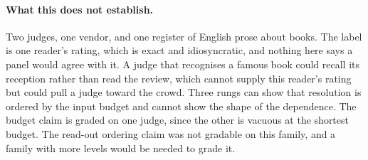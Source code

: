 \paragraph{What this does not establish.}
Two judges, one vendor, and one register of English prose about books. The label is one reader's rating, which is exact and idiosyncratic, and nothing here says a panel would agree with it. A judge that recognises a famous book could recall its reception rather than read the review, which cannot supply this reader's rating but could pull a judge toward the crowd. Three rungs can show that resolution is ordered by the input budget and cannot show the shape of the dependence. The budget claim is graded on one judge, since the other is vacuous at the shortest budget. The read-out ordering claim was not gradable on this family, and a family with more levels would be needed to grade it.
